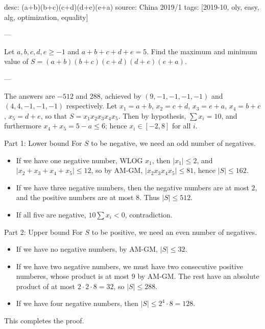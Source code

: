 desc: (a+b)(b+c)(c+d)(d+e)(e+a)
source: China 2019/1
tags: [2019-10, oly, easy, alg, optimization, equality]

---

Let $a,b,c,d,e\ge-1$ and $a+b+c+d+e=5$. Find the maximum and minimum value of $S=(a+b)(b+c)(c+d)(d+e)(e+a)$.

---

The answers are $-512$ and $288$, achieved by $(9,-1,-1,-1,-1)$ and $(4,4,-1,-1,-1)$ respectively. Let $x_1=a+b$, $x_2=c+d$, $x_3=e+a$, $x_4=b+c$, $x_5=d+e$, so that $S=x_1x_2x_3x_4x_5$. Then by hypothesis, $\sum x_i=10$, and furthermore $x_4+x_5=5-a\le6$; hence $x_i\in[-2,8]$ for all $i$.
\begin{customenv}{Part 1: Lower bound}
    For $S$ to be negative, we need an odd number of negatives.
    \begin{itemize}
        \item If we have one negative number, WLOG $x_1$, then $|x_1|\le2$, and $|x_2+x_3+x_4+x_5|\le12$, so by AM-GM, $|x_2x_3x_4x_5|\le81$, hence $|S|\le162$.
        \item If we have three negative numbers, then the negative numbers are at most $2$, and the positive numbers are at most $8$. Thus $|S|\le512$.
        \item If all five are negative, $10\sum x_i<0$, contradiction.
    \end{itemize}
\end{customenv}
\begin{customenv}{Part 2: Upper bound}
    For $S$ to be positive, we need an even number of negatives.
    \begin{itemize}
        \item If we have no negative numbers, by AM-GM, $|S|\le32$.
        \item If we have two negative numbers, we must have two consecutive positive numberes, whose product is at most $9$ by AM-GM. The rest have an absolute product of at most $2\cdot2\cdot8=32$, so $|S|\le288$.
        \item If we have four negative numbers, then $|S|\le2^4\cdot8=128$.
    \end{itemize}
\end{customenv}
\noindent This completes the proof.
